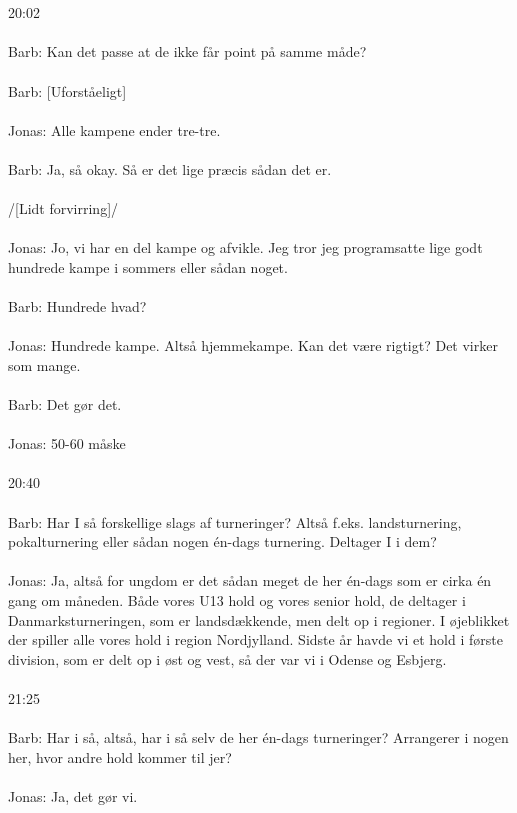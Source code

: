 \\\\
20:02
\\\\
Barb: Kan det passe at de ikke får point på samme måde?
\\\\
Barb: [Uforståeligt]
\\\\
Jonas: Alle kampene ender tre-tre.
\\\\
Barb: Ja, så okay. Så er det lige præcis sådan det er.
\\\\
/[Lidt forvirring]/
\\\\
Jonas: Jo, vi har en del kampe og afvikle. Jeg tror jeg programsatte lige godt hundrede kampe i sommers eller sådan noget.
\\\\
Barb: Hundrede hvad?
\\\\
Jonas: Hundrede kampe. Altså hjemmekampe. Kan det være rigtigt? Det virker som mange. 
\\\\
Barb: Det gør det.
\\\\
Jonas: 50-60 måske
\\\\
20:40
\\\\
Barb: Har I så forskellige slags af turneringer? Altså f.eks. landsturnering, pokalturnering eller sådan nogen én-dags turnering. Deltager I i dem?
\\\\
Jonas: Ja, altså for ungdom er det sådan meget de her én-dags som er cirka én gang om måneden. Både vores U13 hold og vores senior hold, de deltager i Danmarksturneringen, som er landsdækkende, men delt op i regioner. I øjeblikket der spiller alle vores hold i region Nordjylland. Sidste år havde vi et hold i første division, som er delt op i øst og vest, så der var vi i Odense og Esbjerg. 
\\\\
21:25
\\\\
Barb: Har i så, altså, har i så selv de her én-dags turneringer? Arrangerer i nogen her, hvor andre hold kommer til jer?
\\\\
Jonas: Ja, det gør vi.
